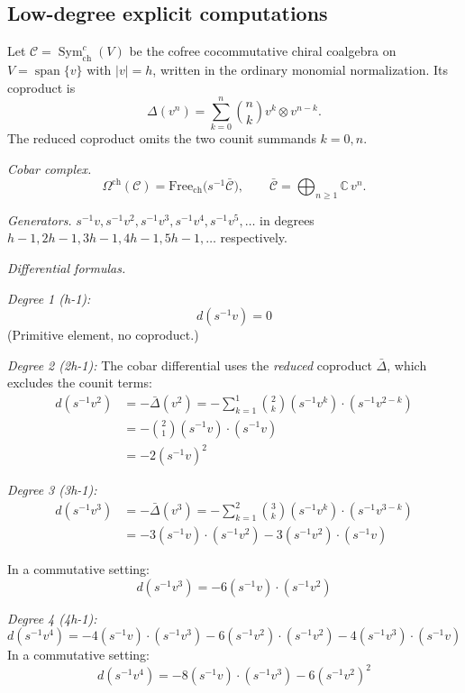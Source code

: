 \subsection{Low-degree explicit computations}

\begin{example}
\label{ex:cobar-linear-complete}

Let
$\mathcal{C}=\operatorname{Sym}^{c}_{\mathrm{ch}}(V)$ be the
cofree cocommutative chiral coalgebra on
$V=\operatorname{span}\{v\}$ with $|v|=h$, written in the ordinary
monomial normalization. Its coproduct is
\[
\Delta(v^n)=\sum_{k=0}^{n}\binom{n}{k}v^k\otimes v^{n-k}.
\]
The reduced coproduct omits the two counit summands $k=0,n$.

\emph{Cobar complex.}
\[
\Omega^{\text{ch}}(\mathcal{C})
=\mathrm{Free}_{\text{ch}}\bigl(s^{-1}\bar{\mathcal C}\bigr),
\qquad
\bar{\mathcal C}=\bigoplus_{n\geq1}\mathbb C\,v^n .
\]

\emph{Generators.} $s^{-1}v, s^{-1}v^2, s^{-1}v^3, s^{-1}v^4, s^{-1}v^5, \ldots$
in degrees $h-1, 2h-1, 3h-1, 4h-1, 5h-1, \ldots$ respectively.

\emph{Differential formulas.}

\emph{Degree 1 (h-1):}
\[d(s^{-1}v) = 0\]
(Primitive element, no coproduct.)

\emph{Degree 2 (2h-1):}
The cobar differential uses the \emph{reduced} coproduct $\bar{\Delta}$, which excludes the counit terms:
\begin{align*}
d(s^{-1}v^2) &= -\bar{\Delta}(v^2) = -\sum_{k=1}^{1} \binom{2}{k} (s^{-1}v^k) \cdot (s^{-1}v^{2-k}) \\
&= -\binom{2}{1}(s^{-1}v) \cdot (s^{-1}v) \\
&= -2(s^{-1}v)^2
\end{align*}

\emph{Degree 3 (3h-1):}
\begin{align*}
d(s^{-1}v^3) &= -\bar{\Delta}(v^3) = -\sum_{k=1}^{2} \binom{3}{k} (s^{-1}v^k) \cdot (s^{-1}v^{3-k}) \\
&= -3(s^{-1}v) \cdot (s^{-1}v^2) - 3(s^{-1}v^2) \cdot (s^{-1}v)
\end{align*}

In a commutative setting:
\[d(s^{-1}v^3) = -6(s^{-1}v) \cdot (s^{-1}v^2)\]

\emph{Degree 4 (4h-1):}
\[d(s^{-1}v^4) = -4(s^{-1}v) \cdot (s^{-1}v^3) - 6(s^{-1}v^2) \cdot (s^{-1}v^2) - 4(s^{-1}v^3) \cdot (s^{-1}v)\]
In a commutative setting:
\[d(s^{-1}v^4) = -8(s^{-1}v) \cdot (s^{-1}v^3) - 6(s^{-1}v^2)^2\]


\end{example}
